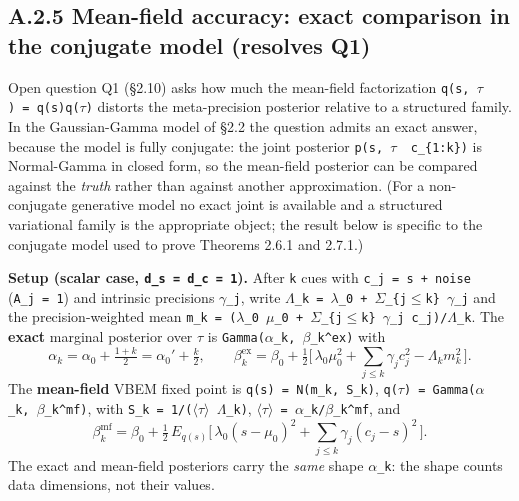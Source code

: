 \documentclass{article}
\begin{document}
\subsection{A.2.5 Mean-field accuracy: exact comparison in the conjugate
model (resolves
Q1)}\label{a.2.5-mean-field-accuracy-exact-comparison-in-the-conjugate-model-resolves-q1}

Open question Q1 (\S{}2.10) asks how much the mean-field factorization
\texttt{q(s,\ \ensuremath{\tau})\ =\ q(s)q(\ensuremath{\tau})} distorts the meta-precision posterior
relative to a structured family. In the Gaussian-Gamma model of \S{}2.2 the
question admits an exact answer, because the model is fully conjugate:
the joint posterior \texttt{p(s,\ \ensuremath{\tau}\ \textbar{}\ c\_\{1:k\})} is
Normal-Gamma in closed form, so the mean-field posterior can be compared
against the \emph{truth} rather than against another approximation. (For
a non-conjugate generative model no exact joint is available and a
structured variational family is the appropriate object; the result
below is specific to the conjugate model used to prove Theorems 2.6.1
and 2.7.1.)

\textbf{Setup (scalar case, \texttt{d\_s\ =\ d\_c\ =\ 1}).} After
\texttt{k} cues with \texttt{c\_j\ =\ s\ +\ noise} (\texttt{A\_j\ =\ 1})
and intrinsic precisions \texttt{\ensuremath{\gamma}\_j}, write
\texttt{\ensuremath{\Lambda}\_k\ =\ \ensuremath{\lambda}\_0\ +\ \ensuremath{\Sigma}\_\{j\ensuremath{\leq}k\}\ \ensuremath{\gamma}\_j} and the precision-weighted
mean \texttt{m\_k\ =\ (\ensuremath{\lambda}\_0\ \ensuremath{\mu}\_0\ +\ \ensuremath{\Sigma}\_\{j\ensuremath{\leq}k\}\ \ensuremath{\gamma}\_j\ c\_j)/\ensuremath{\Lambda}\_k}. The
\textbf{exact} marginal posterior over \texttt{\ensuremath{\tau}} is
\texttt{Gamma(\ensuremath{\alpha}\_k,\ \ensuremath{\beta}\_k\^{}ex)} with \[
\alpha_k = \alpha_0 + \tfrac{1+k}{2} = \alpha_0' + \tfrac{k}{2}, \qquad
\beta_k^{\mathrm{ex}} = \beta_0 + \tfrac12\big[\, \lambda_0 \mu_0^2 + \textstyle\sum_{j\le k} \gamma_j c_j^2 - \Lambda_k m_k^2 \,\big].
\] The \textbf{mean-field} VBEM fixed point is
\texttt{q(s)\ =\ N(m\_k,\ S\_k)},
\texttt{q(\ensuremath{\tau})\ =\ Gamma(\ensuremath{\alpha}\_k,\ \ensuremath{\beta}\_k\^{}mf)}, with
\texttt{S\_k\ =\ 1/(\ensuremath{\langle}\ensuremath{\tau}\ensuremath{\rangle}\ \ensuremath{\Lambda}\_k)}, \texttt{\ensuremath{\langle}\ensuremath{\tau}\ensuremath{\rangle}\ =\ \ensuremath{\alpha}\_k/\ensuremath{\beta}\_k\^{}mf}, and
\[
\beta_k^{\mathrm{mf}} = \beta_0 + \tfrac12\, E_{q(s)}\!\big[\, \lambda_0 (s-\mu_0)^2 + \textstyle\sum_{j\le k} \gamma_j (c_j - s)^2 \,\big].
\] The exact and mean-field posteriors carry the \emph{same} shape
\texttt{\ensuremath{\alpha}\_k}: the shape counts data dimensions, not their values.
\end{document}

